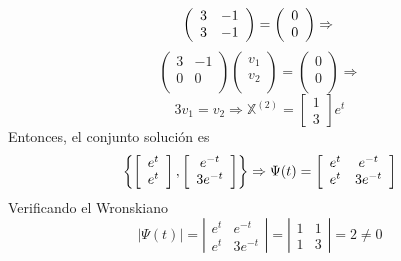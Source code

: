 \documentclass[12pt,spanish,lettersize,twocolumn]{article}
\begin{document}
\begin{equation*}
\left(
\begin{array}{rr}
3 & -1\\
3 & -1\\
\end{array}
\right)=
\left(
\begin{array}{c}
0\\
0\\
\end{array}
\right)\Rightarrow\\
\end{equation*}
\begin{equation*}
\left(
\begin{array}{rr}
3 & -1\\
0 & 0\\
\end{array}
\right)
\left(
\begin{array}{c}
v_1\\
v_2\\
\end{array}
\right)=
\left(
\begin{array}{c}
0\\
0\\
\end{array}
\right)\Rightarrow
\end{equation*}
\begin{equation}
3v_1=v_2\Rightarrow
\mathbb{X}^{(2)}=
\left[\begin{array}{c}
1\\
3
\end{array}
\right]e^t
\end{equation}
Entonces, el conjunto soluci\'on es
\begin{equation}
\left\{\left[
\begin{array}{c}
e^t\\
e^t
\end{array}
\right],\left[
\begin{array}{c}
e^{-t}\\
3e^{-t}
\end{array}
\right]
\right\}\Rightarrow\\
\Psi(t)=
\left[
\begin{array}{cc}
e^t & e^{-t}\\
e^t & 3e^{-t}
\end{array}
\right]
\end{equation}
Verificando el Wronskiano
\begin{equation*}
|\Psi(t)|=
\left|
\begin{array}{cc}
e^t & e^{-t}\\
e^t & 3e^{-t}
\end{array}
\right|=
\left|
\begin{array}{cc}
1 & 1\\
1 & 3
\end{array}
\right|=2\neq 0
\end{equation*}
\end{document}
